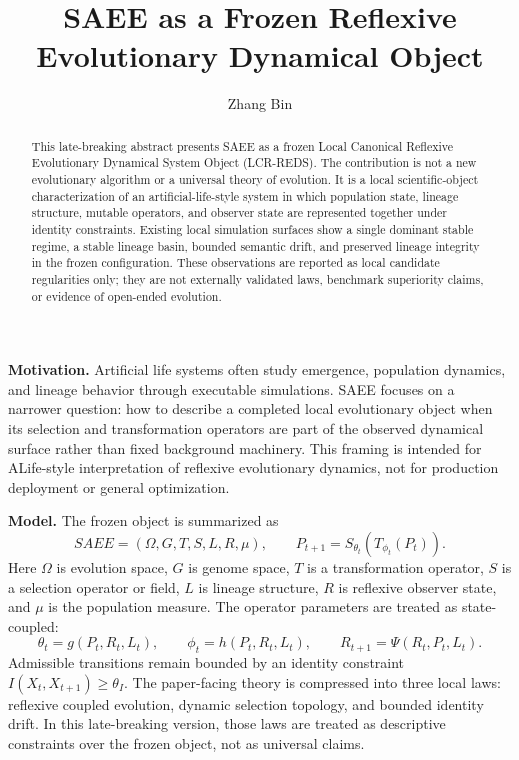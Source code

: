\documentclass[10pt]{article}
\title{\vspace{-1.5em}SAEE as a Frozen Reflexive Evolutionary Dynamical Object}
\author{Zhang Bin}
\date{}
\begin{document}
\maketitle
\vspace{-1.6em}

\begin{abstract}
This late-breaking abstract presents SAEE as a frozen Local Canonical
Reflexive Evolutionary Dynamical System Object (LCR-REDS). The contribution is
not a new evolutionary algorithm or a universal theory of evolution. It is a
local scientific-object characterization of an artificial-life-style system in
which population state, lineage structure, mutable operators, and observer
state are represented together under identity constraints. Existing local
simulation surfaces show a single dominant stable regime, a stable lineage
basin, bounded semantic drift, and preserved lineage integrity in the frozen
configuration. These observations are reported as local candidate regularities
only; they are not externally validated laws, benchmark superiority claims, or
evidence of open-ended evolution.
\end{abstract}

\textbf{Motivation.}
Artificial life systems often study emergence, population dynamics, and
lineage behavior through executable simulations. SAEE focuses on a narrower
question: how to describe a completed local evolutionary object when its
selection and transformation operators are part of the observed dynamical
surface rather than fixed background machinery. This framing is intended for
ALife-style interpretation of reflexive evolutionary dynamics, not for
production deployment or general optimization.

\textbf{Model.}
The frozen object is summarized as
\[
  SAEE = (\Omega, G, T, S, L, R, \mu),
  \qquad
  P_{t+1}=S_{\theta_t}(T_{\phi_t}(P_t)).
\]
Here $\Omega$ is evolution space, $G$ is genome space, $T$ is a transformation
operator, $S$ is a selection operator or field, $L$ is lineage structure, $R$
is reflexive observer state, and $\mu$ is the population measure. The
operator parameters are treated as state-coupled:
\[
  \theta_t=g(P_t,R_t,L_t),\qquad
  \phi_t=h(P_t,R_t,L_t),\qquad
  R_{t+1}=\Psi(R_t,P_t,L_t).
\]
Admissible transitions remain bounded by an identity constraint
$I(X_t,X_{t+1})\geq\theta_I$. The paper-facing theory is compressed into three
local laws: reflexive coupled evolution, dynamic selection topology, and
bounded identity drift. In this late-breaking version, those laws are treated
as descriptive constraints over the frozen object, not as universal claims.
\end{document}
